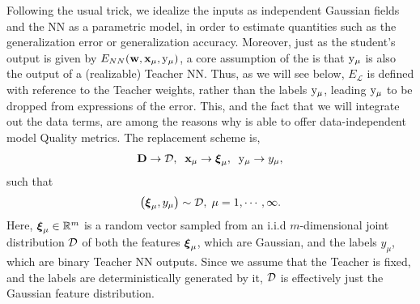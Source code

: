 Following the usual \StatisticalMechanics trick, we idealize the inputs as independent Gaussian fields and the NN as a parametric model, in order to estimate quantities such as the generalization error or generalization accuracy. Moreover, just as the student's output is given by $E_{NN}({\mathbf{w}},{\mathbf{x}}_{\mu},\mathrm{y}_{\mu})$, a core assumption of the \SETOL is that $\mathrm{y}_{\mu}$ is also the output of a (realizable) Teacher NN. Thus, as we will see below, $E_{\mathcal{L}}$ is defined with reference to the Teacher weights, rather than the labels $\mathrm{y}_{\mu}$, leading $\mathrm{y}_{\mu}$ to be dropped from expressions of the error. This, and the fact that we will integrate out the data terms, are among the reasons why \SETOL is able to offer data-independent model Quality metrics. The replacement scheme is,
\begin{align}
\label{eqn:model_real_world_expt}
  \mathbf{D} \rightarrow \mathcal{D},\;\;{\mathbf{x}}_{\mu} \rightarrow \boldsymbol{\xi}_{\mu},\;\;  \mathrm{y}_{\mu} \rightarrow y_{\mu}  ,
\end{align}
such that
\begin{align}
    \label{eqn:xi}
  \left(\boldsymbol{\xi}_{\mu}, y_{\mu} \right) \sim \mathcal{D},\;\mu=1, \cdots, \infty  .
\end{align}
Here, $\boldsymbol{\xi}_{\mu}\in\mathbb{R}^{m}$ is a random vector %
sampled from an i.i.d $m$-dimensional joint distribution $\mathcal{D}$ of both the features $\boldsymbol{\xi}_{\mu}$, which are Gaussian, and the labels $y_{\mu}$, which are binary Teacher NN outputs. Since we assume that the Teacher is fixed, and the labels are deterministically generated by it, $\mathcal{D}$ is effectively just the Gaussian feature distribution.


